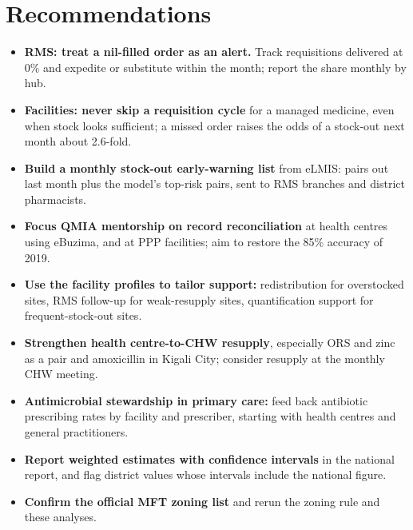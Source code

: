 \documentclass[10pt,a4paper]{article}
\begin{document}
\section{Recommendations}
\begin{itemize}\item \textbf{RMS: treat a nil-filled order as an alert.} Track requisitions delivered at 0\% and expedite or substitute within the month; report the share monthly by hub.
\item \textbf{Facilities: never skip a requisition cycle} for a managed medicine, even when stock looks sufficient; a missed order raises the odds of a stock-out next month about 2.6-fold.
\item \textbf{Build a monthly stock-out early-warning list} from eLMIS: pairs out last month plus the model's top-risk pairs, sent to RMS branches and district pharmacists.
\item \textbf{Focus QMIA mentorship on record reconciliation} at health centres using eBuzima, and at PPP facilities; aim to restore the 85\% accuracy of 2019.
\item \textbf{Use the facility profiles to tailor support:} redistribution for overstocked sites, RMS follow-up for weak-resupply sites, quantification support for frequent-stock-out sites.
\item \textbf{Strengthen health centre-to-CHW resupply}, especially ORS and zinc as a pair and amoxicillin in Kigali City; consider resupply at the monthly CHW meeting.
\item \textbf{Antimicrobial stewardship in primary care:} feed back antibiotic prescribing rates by facility and prescriber, starting with health centres and general practitioners.
\item \textbf{Report weighted estimates with confidence intervals} in the national report, and flag district values whose intervals include the national figure.
\item \textbf{Confirm the official MFT zoning list} and rerun the zoning rule and these analyses.
\end{itemize}
\end{document}
